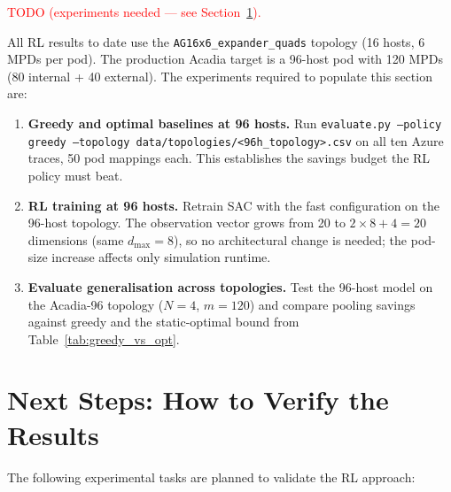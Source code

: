 \documentclass[11pt]{article}
\newcommand{\red}[1]{\textcolor{red}{#1}}
\begin{document}
\red{TODO (experiments needed --- see Section~\ref{sec:next_steps}).}

All RL results to date use the \texttt{AG16x6\_expander\_quads} topology
(16 hosts, 6 MPDs per pod).  The production Acadia target is a 96-host pod
with 120 MPDs (80 internal + 40 external).  The experiments required to
populate this section are:

\begin{enumerate}
    \item \textbf{Greedy and optimal baselines at 96 hosts.}
          Run \texttt{evaluate.py --policy greedy --topology
          data/topologies/<96h\_topology>.csv} on all ten Azure traces, 50
          pod mappings each.  This establishes the savings budget the RL
          policy must beat.
    \item \textbf{RL training at 96 hosts.}
          Retrain SAC with the fast configuration on the 96-host topology.
          The observation vector grows from 20 to $2 \times 8 + 4 = 20$
          dimensions (same $d_{\max}=8$), so no architectural change is
          needed; the pod-size increase affects only simulation runtime.
    \item \textbf{Evaluate generalisation across topologies.}
          Test the 96-host model on the Acadia-96 topology ($N=4$,
          $m=120$) and compare pooling savings against greedy and the
          static-optimal bound from Table~\ref{tab:greedy_vs_opt}.
\end{enumerate}

\section{Next Steps: How to Verify the Results}
\label{sec:next_steps}

The following experimental tasks are planned to validate the RL approach:
\end{document}
